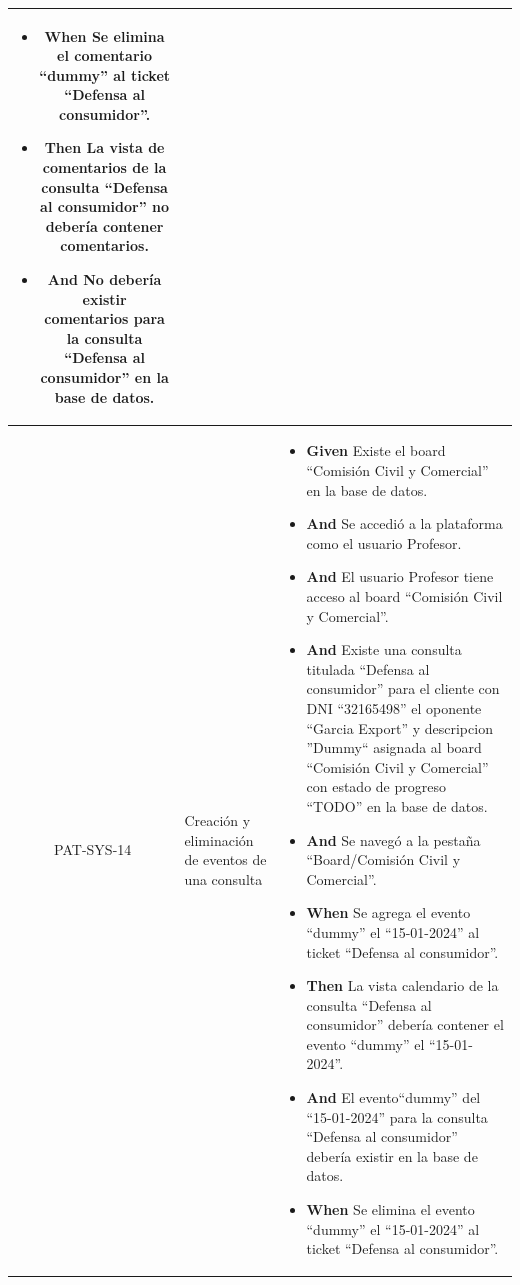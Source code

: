 \begin{longtable}{|c|p{2.5cm}|p{10.5cm}|}
\begin{itemize}
        \item \textbf{When} Se elimina el comentario ``dummy''  al ticket ``Defensa al consumidor''.
        \newline
    
        \item \textbf{Then} La vista de comentarios de la consulta ``Defensa al consumidor'' no debería contener comentarios.
        \item \textbf{And} No debería existir comentarios para la consulta ``Defensa al consumidor'' en la base de datos.
    \end{itemize}
    \\ 
    \hline
         PAT-SYS-14 & Creación y eliminación de eventos de una consulta & 
        \begin{itemize}
        \item \textbf{Given} Existe el board ``Comisión Civil y Comercial'' en la base de datos.
        \item \textbf{And} Se accedió a la plataforma como el usuario Profesor.
        \item \textbf{And} El usuario Profesor tiene acceso al board ``Comisión Civil y Comercial''.
        \item \textbf{And} Existe una consulta titulada ``Defensa al consumidor'' para el cliente con DNI ``32165498'' el oponente ``Garcia Export'' y descripcion ''Dummy`` asignada al board ``Comisión Civil y Comercial'' con estado de progreso ``TODO'' en la base de datos.
        \item \textbf{And} Se navegó a la pestaña ``Board/Comisión Civil y Comercial''.
        \newline
    
        \item \textbf{When} Se agrega el evento ``dummy'' el ``15-01-2024'' al ticket ``Defensa al consumidor''.
        \newline
    
        \item \textbf{Then} La vista calendario de la consulta ``Defensa al consumidor'' debería contener el evento ``dummy'' el ``15-01-2024''.
        \item \textbf{And} El evento``dummy'' del ``15-01-2024'' para la consulta ``Defensa al consumidor'' debería existir en la base de datos.
        \newline

        \item \textbf{When} Se elimina el evento ``dummy'' el ``15-01-2024'' al ticket ``Defensa al consumidor''.
        \newline
        

\end{itemize}
\end{longtable}
